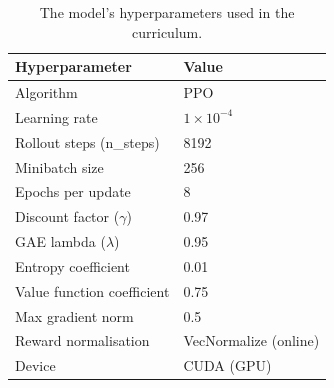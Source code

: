 \begin{table}[H]
    \small
    \centering
    \caption{The model's hyperparameters used in the curriculum.}
    \label{tab:hyperparameters}
    \begin{tabular}{p{6cm} p{6cm}}
        \hline\hline
        \rowcolor{lightgray}\textbf{Hyperparameter} & \textbf{Value} \\\hline
        Algorithm & PPO \\
        \rowcolor{lightlightgray} Learning rate & $1\times10^{-4}$ \\
        Rollout steps (n\_steps) & 8192 \\
        \rowcolor{lightlightgray} Minibatch size & 256 \\
        Epochs per update & 8 \\
        \rowcolor{lightlightgray} Discount factor ($\gamma$) & 0.97 \\
        GAE lambda ($\lambda$) & 0.95 \\
        \rowcolor{lightlightgray} Entropy coefficient & 0.01 \\
        Value function coefficient & 0.75 \\
        \rowcolor{lightlightgray} Max gradient norm & 0.5 \\
        Reward normalisation & VecNormalize (online) \\
        \rowcolor{lightlightgray} Device & CUDA (GPU) \\
        \hline
    \end{tabular}
\end{table}
